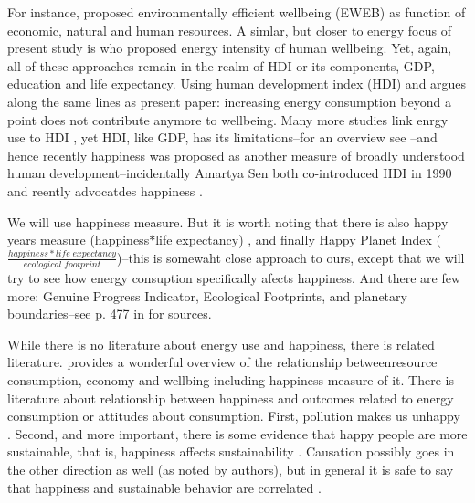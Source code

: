 \documentclass[10pt, letterpaper]{article}
\begin{document}
\begin{spacing}{1.4}
For instance, \citet{dietz09} proposed environmentally efficient wellbeing
(EWEB) as function of economic, natural and human resources. A simlar, but
closer to energy focus of present study is \citet{jorgenson14B} who proposed
energy intensity of human wellbeing. Yet, again, all of these approaches remain
in the realm of HDI or its components, GDP, education and life expectancy. 
 Using human development index (HDI) \citep{steinberger10} and argues along the
 same lines as present paper: increasing energy consumption beyond a point does
 not contribute anymore to wellbeing.  Many more studies link enrgy use to HDI
 \citep[e.g.]{dias06}, yet HDI, like  GDP, has its limitations--for an overview
 see \citet{klugman11}--and hence  recently happiness was proposed as another
 measure of broadly understood human  development--incidentally Amartya Sen both
 co-introduced HDI in 1990 and  reently advocatdes happiness \citep{stiglitz09al}. 

We will use happiness measure. But it is worth noting that there is also
 happy years measure (happiness$*$life expectancy) \citep{veenhoven96B}, and
 finally Happy Planet Index ($\frac{happiness*life\;expectancy}{ecological\;footprint}$)--this is somewaht close approach to  ours, except that we will try to see how energy consuption specifically afects  happiness. And there are few more: Genuine Progress Indicator, Ecological Footprints,  and planetary boundaries--see p. 477 in \citet{pretty13} for  sources. 


While there is no literature about energy use and happiness, there is related
literature. \citet{pretty13} provides a wonderful overview of the relationship
betweenresource consumption, economy and wellbing including happiness measure of
it. There is literature about relationship between happiness and outcomes
related to energy consumption or attitudes about consumption. First, pollution makes us unhappy \citep{weinhold12,welsch05}. Second,
and more important,  there is some evidence that happy people
are more sustainable, that is, happiness affects sustainability
\citep{ericson14}.  Causation possibly goes in the
other direction as well (as noted by authors), but in general it is
safe to say that happiness and sustainable behavior are correlated  \citep{brown05,corral11}.


\end{spacing}
\end{document}
